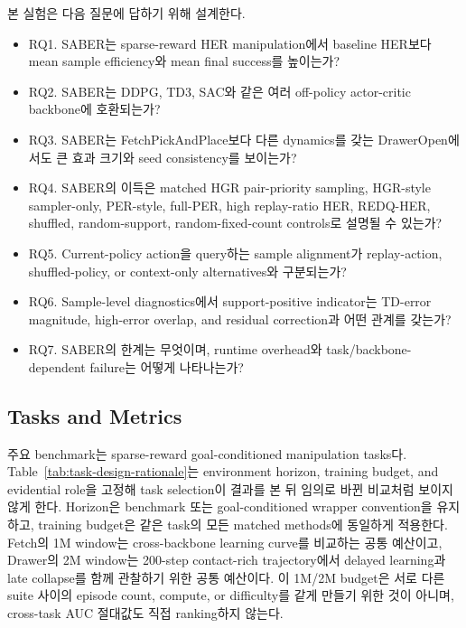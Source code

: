 \documentclass[letterpaper]{article}
\begin{document}
본 실험은 다음 질문에 답하기 위해 설계한다.
\begin{itemize}
    \item RQ1. SABER는 sparse-reward HER manipulation에서 baseline HER보다 mean sample efficiency와 mean final success를 높이는가?
    \item RQ2. SABER는 DDPG, TD3, SAC와 같은 여러 off-policy actor-critic backbone에 호환되는가?
    \item RQ3. SABER는 FetchPickAndPlace보다 다른 dynamics를 갖는 DrawerOpen에서도 큰 효과 크기와 seed consistency를 보이는가?
    \item RQ4. SABER의 이득은 matched HGR pair-priority sampling, HGR-style sampler-only, PER-style, full-PER, high replay-ratio HER, REDQ-HER, shuffled, random-support, random-fixed-count controls로 설명될 수 있는가?
    \item RQ5. Current-policy action을 query하는 sample alignment가 replay-action, shuffled-policy, or context-only alternatives와 구분되는가?
    \item RQ6. Sample-level diagnostics에서 support-positive indicator는 TD-error magnitude, high-error overlap, and residual correction과 어떤 관계를 갖는가?
    \item RQ7. SABER의 한계는 무엇이며, runtime overhead와 task/backbone-dependent failure는 어떻게 나타나는가?
\end{itemize}

\subsection{Tasks and Metrics}

주요 benchmark는 sparse-reward goal-conditioned manipulation tasks다. Table~\ref{tab:task-design-rationale}는 environment horizon, training budget, and evidential role을 고정해 task selection이 결과를 본 뒤 임의로 바뀐 비교처럼 보이지 않게 한다. Horizon은 benchmark 또는 goal-conditioned wrapper convention을 유지하고, training budget은 같은 task의 모든 matched methods에 동일하게 적용한다. Fetch의 1M window는 cross-backbone learning curve를 비교하는 공통 예산이고, Drawer의 2M window는 200-step contact-rich trajectory에서 delayed learning과 late collapse를 함께 관찰하기 위한 공통 예산이다. 이 1M/2M budget은 서로 다른 suite 사이의 episode count, compute, or difficulty를 같게 만들기 위한 것이 아니며, cross-task AUC 절대값도 직접 ranking하지 않는다.
\end{document}
